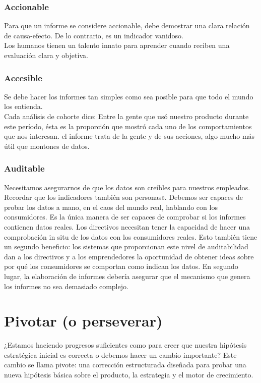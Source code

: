 \documentclass[10pt]{article}
\begin{document}
\begin{multicols}{2}
\subsubsection*{Accionable}
Para que un informe se considere accionable, debe demostrar una clara relación de causa-efecto. De lo contrario, es un indicador vanidoso.\\
Los humanos tienen un talento innato para aprender cuando reciben una evaluación clara y objetiva.
\subsubsection*{Accesible}
Se debe  hacer los informes tan simples como sea posible para que todo el mundo los entienda.\\
Cada análisis de cohorte dice: Entre la gente que usó nuestro producto durante este período, ésta es la proporción que mostró cada uno de los comportamientos que nos interesan. {\color{blue}el informe trata de la gente y de sus acciones, algo mucho más útil que montones de datos.}
\subsubsection*{Auditable}
Necesitamos asegurarnos de que los datos son creíbles para nuestros empleados.\\
Recordar que los indicadores también son personas». Debemos ser capaces de probar los datos a mano, en el caos del mundo real, hablando con los consumidores. Es la única manera de ser capaces de comprobar si los informes contienen datos reales. Los directivos necesitan tener la capacidad de hacer una comprobación in situ de los datos con los consumidores reales. Esto también tiene un segundo beneficio: los sistemas que proporcionan este nivel de auditabilidad dan a los directivos y a los emprendedores la oportunidad de obtener ideas sobre por qué los consumidores se comportan como indican los datos.
{\color{blue}En segundo lugar, la elaboración de informes debería asegurar que el mecanismo que genera los informes no sea demasiado complejo.}
\section*{Pivotar (o perseverar)}
¿Estamos haciendo progresos suficientes como para creer que nuestra hipótesis estratégica inicial es correcta o debemos hacer un cambio importante? Este cambio se llama {\color{blue}pivote: una corrección estructurada diseñada para probar una nueva hipótesis básica sobre el producto, la estrategia y el motor de crecimiento.} 

\end{multicols}
\end{document}
